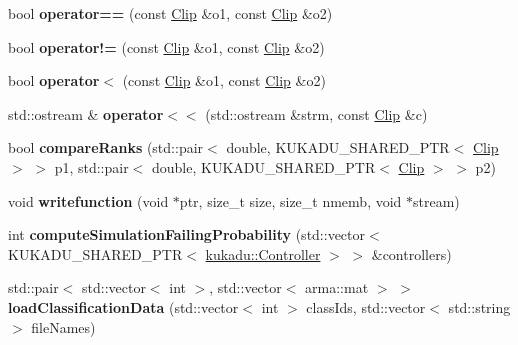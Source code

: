 \begin{DoxyCompactItemize}
\item 
bool {\bfseries operator==} (const \hyperlink{classkukadu_1_1Clip}{Clip} \&o1, const \hyperlink{classkukadu_1_1Clip}{Clip} \&o2)\hypertarget{namespacekukadu_ac6e6b9fba33fff6363495dd91f0dc2e3}{}\label{namespacekukadu_ac6e6b9fba33fff6363495dd91f0dc2e3}

\item 
bool {\bfseries operator!=} (const \hyperlink{classkukadu_1_1Clip}{Clip} \&o1, const \hyperlink{classkukadu_1_1Clip}{Clip} \&o2)\hypertarget{namespacekukadu_aa0c29fe932bb4fab8615a7fc1e709a4e}{}\label{namespacekukadu_aa0c29fe932bb4fab8615a7fc1e709a4e}

\item 
bool {\bfseries operator$<$} (const \hyperlink{classkukadu_1_1Clip}{Clip} \&o1, const \hyperlink{classkukadu_1_1Clip}{Clip} \&o2)\hypertarget{namespacekukadu_a2144e04f1c0705a360cd6149f0ee0bda}{}\label{namespacekukadu_a2144e04f1c0705a360cd6149f0ee0bda}

\item 
std\+::ostream \& {\bfseries operator$<$$<$} (std\+::ostream \&strm, const \hyperlink{classkukadu_1_1Clip}{Clip} \&c)\hypertarget{namespacekukadu_a6094d0956675a7442f632511e3c225c2}{}\label{namespacekukadu_a6094d0956675a7442f632511e3c225c2}

\item 
bool {\bfseries compare\+Ranks} (std\+::pair$<$ double, K\+U\+K\+A\+D\+U\+\_\+\+S\+H\+A\+R\+E\+D\+\_\+\+P\+TR$<$ \hyperlink{classkukadu_1_1Clip}{Clip} $>$ $>$ p1, std\+::pair$<$ double, K\+U\+K\+A\+D\+U\+\_\+\+S\+H\+A\+R\+E\+D\+\_\+\+P\+TR$<$ \hyperlink{classkukadu_1_1Clip}{Clip} $>$ $>$ p2)\hypertarget{namespacekukadu_a13f6dc9a722ad4e8f9423b09c5f8891f}{}\label{namespacekukadu_a13f6dc9a722ad4e8f9423b09c5f8891f}

\item 
void {\bfseries writefunction} (void $\ast$ptr, size\+\_\+t size, size\+\_\+t nmemb, void $\ast$stream)\hypertarget{namespacekukadu_a3d72e272272f9e1876c2b0d2062f36c9}{}\label{namespacekukadu_a3d72e272272f9e1876c2b0d2062f36c9}

\item 
int {\bfseries compute\+Simulation\+Failing\+Probability} (std\+::vector$<$ K\+U\+K\+A\+D\+U\+\_\+\+S\+H\+A\+R\+E\+D\+\_\+\+P\+TR$<$ \hyperlink{classkukadu_1_1Controller}{kukadu\+::\+Controller} $>$ $>$ \&controllers)\hypertarget{namespacekukadu_a12c3f942ac0872bcc84f702257b7c459}{}\label{namespacekukadu_a12c3f942ac0872bcc84f702257b7c459}

\item 
std\+::pair$<$ std\+::vector$<$ int $>$, std\+::vector$<$ arma\+::mat $>$ $>$ {\bfseries load\+Classification\+Data} (std\+::vector$<$ int $>$ class\+Ids, std\+::vector$<$ std\+::string $>$ file\+Names)\hypertarget{namespacekukadu_aed3069e66787dd00d4a535ad7e1ab91d}{}\label{namespacekukadu_aed3069e66787dd00d4a535ad7e1ab91d}


\end{DoxyCompactItemize}
